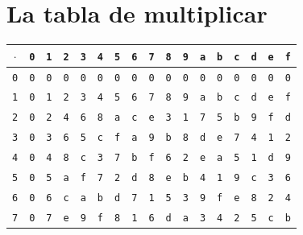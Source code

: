 \documentclass[11pt,a4paper,oneside]{report}
\begin{document}
\section{La tabla de multiplicar}

\begin{table}[htbp]
\centering
\setlength{\tabcolsep}{4.2pt}
\begin{tabular}{@{}c@{}c@{}c@{}c@{}c@{}c@{}c@{}c@{}c@{}c@{}c@{}c@{}c@{}c@{}c@{}c@{}c@{}}
\toprule
$\cdot$ & \texttt{0} & \texttt{1} & \texttt{2} & \texttt{3} & \texttt{4} & \texttt{5} & \texttt{6} & \texttt{7} & \texttt{8} & \texttt{9} & \texttt{a} & \texttt{b} & \texttt{c} & \texttt{d} & \texttt{e} & \texttt{f}\\
\midrule
\texttt{0} & \texttt{0} & \texttt{0} & \texttt{0} & \texttt{0} & \texttt{0} & \texttt{0} & \texttt{0} & \texttt{0} & \texttt{0} & \texttt{0} & \texttt{0} & \texttt{0} & \texttt{0} & \texttt{0} & \texttt{0} & \texttt{0}\\
\texttt{1} & \texttt{0} & \texttt{1} & \texttt{2} & \texttt{3} & \texttt{4} & \texttt{5} & \texttt{6} & \texttt{7} & \texttt{8} & \texttt{9} & \texttt{a} & \texttt{b} & \texttt{c} & \texttt{d} & \texttt{e} & \texttt{f}\\
\texttt{2} & \texttt{0} & \texttt{2} & \texttt{4} & \texttt{6} & \texttt{8} & \texttt{a} & \texttt{c} & \texttt{e} & \texttt{3} & \texttt{1} & \texttt{7} & \texttt{5} & \texttt{b} & \texttt{9} & \texttt{f} & \texttt{d}\\
\texttt{3} & \texttt{0} & \texttt{3} & \texttt{6} & \texttt{5} & \texttt{c} & \texttt{f} & \texttt{a} & \texttt{9} & \texttt{b} & \texttt{8} & \texttt{d} & \texttt{e} & \texttt{7} & \texttt{4} & \texttt{1} & \texttt{2}\\
\texttt{4} & \texttt{0} & \texttt{4} & \texttt{8} & \texttt{c} & \texttt{3} & \texttt{7} & \texttt{b} & \texttt{f} & \texttt{6} & \texttt{2} & \texttt{e} & \texttt{a} & \texttt{5} & \texttt{1} & \texttt{d} & \texttt{9}\\
\texttt{5} & \texttt{0} & \texttt{5} & \texttt{a} & \texttt{f} & \texttt{7} & \texttt{2} & \texttt{d} & \texttt{8} & \texttt{e} & \texttt{b} & \texttt{4} & \texttt{1} & \texttt{9} & \texttt{c} & \texttt{3} & \texttt{6}\\
\texttt{6} & \texttt{0} & \texttt{6} & \texttt{c} & \texttt{a} & \texttt{b} & \texttt{d} & \texttt{7} & \texttt{1} & \texttt{5} & \texttt{3} & \texttt{9} & \texttt{f} & \texttt{e} & \texttt{8} & \texttt{2} & \texttt{4}\\
\texttt{7} & \texttt{0} & \texttt{7} & \texttt{e} & \texttt{9} & \texttt{f} & \texttt{8} & \texttt{1} & \texttt{6} & \texttt{d} & \texttt{a} & \texttt{3} & \texttt{4} & \texttt{2} & \texttt{5} & \texttt{c} & \texttt{b}\\

\end{tabular}
\end{table}
\end{document}
